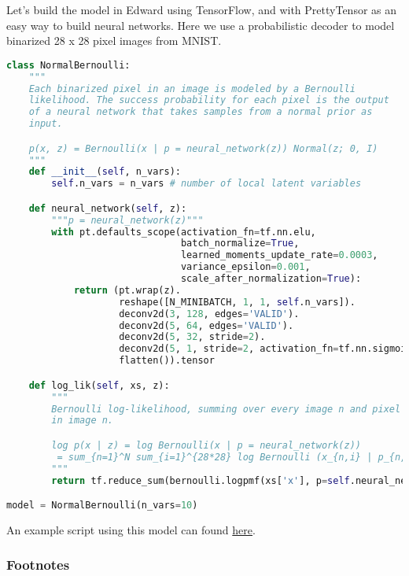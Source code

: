 Let's build the model in Edward using TensorFlow, and with
PrettyTensor as an easy way to build neural networks. Here we use a
probabilistic decoder to model binarized 28 x 28
pixel images from MNIST.
\begin{lstlisting}[language=Python]
class NormalBernoulli:
    """
    Each binarized pixel in an image is modeled by a Bernoulli
    likelihood. The success probability for each pixel is the output
    of a neural network that takes samples from a normal prior as
    input.

    p(x, z) = Bernoulli(x | p = neural_network(z)) Normal(z; 0, I)
    """
    def __init__(self, n_vars):
        self.n_vars = n_vars # number of local latent variables

    def neural_network(self, z):
        """p = neural_network(z)"""
        with pt.defaults_scope(activation_fn=tf.nn.elu,
                               batch_normalize=True,
                               learned_moments_update_rate=0.0003,
                               variance_epsilon=0.001,
                               scale_after_normalization=True):
            return (pt.wrap(z).
                    reshape([N_MINIBATCH, 1, 1, self.n_vars]).
                    deconv2d(3, 128, edges='VALID').
                    deconv2d(5, 64, edges='VALID').
                    deconv2d(5, 32, stride=2).
                    deconv2d(5, 1, stride=2, activation_fn=tf.nn.sigmoid).
                    flatten()).tensor

    def log_lik(self, xs, z):
        """
        Bernoulli log-likelihood, summing over every image n and pixel i
        in image n.

        log p(x | z) = log Bernoulli(x | p = neural_network(z))
         = sum_{n=1}^N sum_{i=1}^{28*28} log Bernoulli (x_{n,i} | p_{n,i})
        """
        return tf.reduce_sum(bernoulli.logpmf(xs['x'], p=self.neural_network(z)))

model = NormalBernoulli(n_vars=10)
\end{lstlisting}

An example script using this model can found
\href{https://github.com/blei-lab/edward/blob/master/examples/convolutional_vae.py}
{here}.

\subsubsection{Footnotes}

